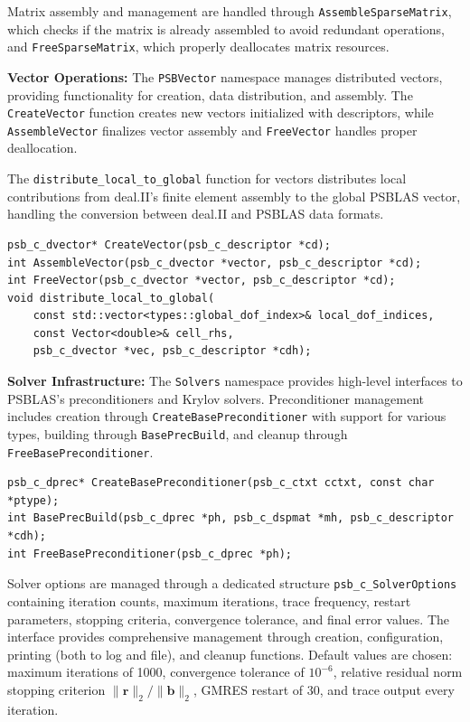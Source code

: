 \documentclass[a4paper,12pt]{article}
\begin{document}
Matrix assembly and management are handled through \texttt{AssembleSparseMatrix}, which
checks if the matrix is already assembled to avoid redundant operations,
and \texttt{FreeSparseMatrix}, which properly deallocates matrix resources.

\textbf{Vector Operations:} The \texttt{PSBVector} namespace manages distributed vectors,
providing functionality for creation, data distribution, and assembly.
The \texttt{CreateVector} function creates new vectors initialized with descriptors,
while \texttt{AssembleVector} finalizes vector assembly and \texttt{FreeVector} handles proper
deallocation.

The \texttt{distribute\_local\_to\_global} function for vectors distributes local
contributions from deal.II's finite element assembly to the global PSBLAS vector,
handling the conversion between deal.II and PSBLAS data formats.

\begin{lstlisting}[caption=Vector operations]
psb_c_dvector* CreateVector(psb_c_descriptor *cd);
int AssembleVector(psb_c_dvector *vector, psb_c_descriptor *cd);
int FreeVector(psb_c_dvector *vector, psb_c_descriptor *cd);
void distribute_local_to_global(
    const std::vector<types::global_dof_index>& local_dof_indices,
    const Vector<double>& cell_rhs,
    psb_c_dvector *vec, psb_c_descriptor *cdh);
\end{lstlisting}

\textbf{Solver Infrastructure:} The \texttt{Solvers} namespace provides high-level
interfaces to PSBLAS's preconditioners and Krylov solvers. Preconditioner management
includes creation through \texttt{CreateBasePreconditioner} with support for various
types, building through \texttt{BasePrecBuild}, and cleanup through
\texttt{FreeBasePreconditioner}.

\begin{lstlisting}[caption=Preconditioner and solver management]
psb_c_dprec* CreateBasePreconditioner(psb_c_ctxt cctxt, const char *ptype);
int BasePrecBuild(psb_c_dprec *ph, psb_c_dspmat *mh, psb_c_descriptor *cdh);
int FreeBasePreconditioner(psb_c_dprec *ph);
\end{lstlisting}

Solver options are managed through a dedicated structure \texttt{psb\_c\_SolverOptions}
containing iteration counts, maximum iterations, trace frequency, restart parameters,
stopping criteria, convergence tolerance, and final error values. The interface provides
comprehensive management through creation, configuration, printing (both to log and file),
and cleanup functions. Default values are chosen: maximum iterations of 1000,
convergence tolerance of $10^{-6}$, relative residual norm stopping criterion
$\|\mathbf{r}\|_2/\|\mathbf{b}\|_2$, GMRES restart of 30, and trace output every iteration.
\end{document}
